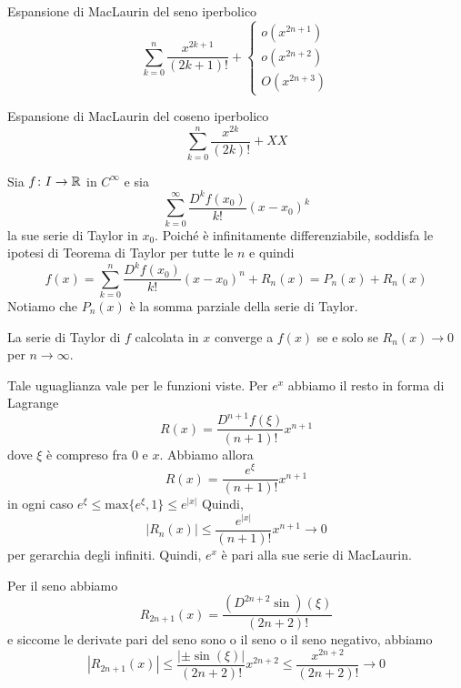 \documentclass[a4paper]{article}
\begin{document}
\begin{snippetexample}{Espansione di MacLaurin del seno iperbolico}
    \[
        \sum_{k=0}^n \frac{x^{2k+1}}{(2k+1)!} + \begin{cases}
            o(x^{2n+1}) \\
            o(x^{2n+2}) \\
            O(x^{2n+3})
        \end{cases}
    \]
\end{snippetexample}

\begin{snippetexample}{Espansione di MacLaurin del coseno iperbolico}
    \[
        \sum_{k=0}^n \frac{x^{2k}}{(2k)!} + XX
    \]
\end{snippetexample}



Sia \(f\colon I \to \mathbb{R}\) in \(C^\infty\)
e sia
\[
    \sum_{k=0}^\infty \frac{D^kf(x_0)}{k!}{(x-x_0)}^k
\]
la sue serie di Taylor in \(x_0\).
Poiché è infinitamente differenziabile, soddisfa le ipotesi di Teorema di Taylor per tutte
le \(n\) e quindi
\[
    f(x) = \sum_{k=0}^n \frac{D^kf(x_0)}{k!}{(x-x_0)}^n + R_n(x)
    = P_n(x) + R_n(x)
\]
Notiamo che \(P_n(x)\) è la somma parziale della serie di Taylor.

\begin{snippettheorem}{}
    La serie di Taylor di \(f\) calcolata in \(x\) converge a \(f(x)\)
    se e solo se
    \(R_n(x) \to 0\) per \(n \to \infty\).
\end{snippettheorem}

Tale uguaglianza vale per le funzioni viste.
Per \(e^x\) abbiamo il resto in forma di Lagrange
\[
    R(x) = \frac{D^{n+1}f(\xi)}{(n+1)!} x^{n+1}
\]
dove \(\xi\) è compreso fra \(0\) e \(x\).
Abbiamo allora
\[
    R(x) = \frac{e^\xi}{(n+1)!}x^{n+1}
\]
in ogni caso \(e^\xi \leq \text{max}\{e^\xi, 1\} \leq e^{|x|}\)
Quindi,
\[
    |R_n(x)| \leq \frac{e^{|x|}}{(n+1)!} x^{n+1} \to 0
\]
per gerarchia degli infiniti.
Quindi, \(e^x\) è pari alla sue serie di MacLaurin.

Per il seno abbiamo
\[
    R_{2n+1}(x) = \frac{(D^{2n+2}\sin)(\xi)}{(2n+2)!}
\]
e siccome le derivate pari del seno sono o il seno o il seno negativo, abbiamo
\[
    |R_{2n+1}(x)| \leq \frac{|\pm\sin(\xi)|}{(2n+2)!}x^{2n+2}
    \leq \frac{x^{2n+2}}{(2n+2)!} \to 0
\]

\end{document}
